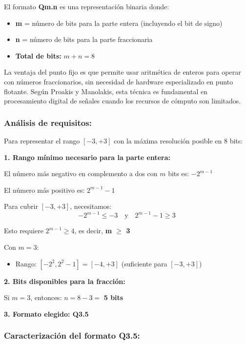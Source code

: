 \documentclass[12pt]{article}
\begin{document}
El formato \textbf{Qm.n} es una representación binaria donde:
\begin{itemize}
    \item \textbf{m} = número de bits para la parte entera (incluyendo el bit de signo)
    \item \textbf{n} = número de bits para la parte fraccionaria
    \item \textbf{Total de bits:} $m + n = 8$
\end{itemize}
 
La ventaja del punto fijo es que permite usar aritmética de enteros para operar con números fraccionarios, sin necesidad de hardware especializado en punto flotante. Según Proakis y Manolakis, esta técnica es fundamental en procesamiento digital de señales cuando los recursos de cómputo son limitados.
 
\subsubsection*{Análisis de requisitos:}
 
Para representar el rango $[-3, +3]$ con la máxima resolución posible en 8 bits:
 
\textbf{1. Rango mínimo necesario para la parte entera:}
 
El número más negativo en complemento a dos con $m$ bits es: $-2^{m-1}$
 
El número más positivo es: $2^{m-1} - 1$
 
Para cubrir $[-3, +3]$, necesitamos:
\begin{equation}
-2^{m-1} \leq -3 \quad \text{y} \quad 2^{m-1} - 1 \geq 3
\end{equation}
 
Esto requiere $2^{m-1} \geq 4$, es decir, \textbf{m $\geq$ 3}
 
Con $m = 3$:
\begin{itemize}
    \item Rango: $[-2^2, 2^2 - 1] = [-4, +3]$ \checkmark (suficiente para $[-3, +3]$)
\end{itemize}
 
\textbf{2. Bits disponibles para la fracción:}
 
Si $m = 3$, entonces: $n = 8 - 3 = $ \textbf{5 bits}
 
\textbf{3. Formato elegido: Q3.5}
 
\subsubsection*{Caracterización del formato Q3.5:}
 
\end{document}
